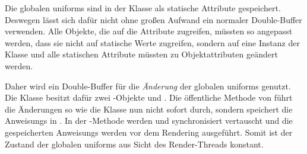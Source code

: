Die globalen \glspl{uniform} sind in der Klasse  als statische Attribute gespeichert. Deswegen lässt sich dafür nicht ohne großen Aufwand ein normaler Double-Buffer verwenden. Alle Objekte, die auf die Attribute zugreifen, müssten so angepasst werden, dass sie nicht auf statische Werte zugreifen, sondern auf eine Instanz der Klasse und alle statischen Attribute müssten zu Objektattributen geändert werden.

Daher wird ein Double-Buffer für die \emph{Änderung} der globalen \glspl{uniform} genutzt. Die Klasse  besitzt dafür zwei -Objekte  und . Die öffentliche Methode  von  führt die Änderungen so wie die Klasse  nun nicht sofort durch, sondern speichert die \glspl{Anweisung} in . In der -Methode werden  und  synchronisiert vertauscht und die gespeicherten \glspl{Anweisung} werden vor dem Rendering ausgeführt. Somit ist der Zustand der globalen \glspl{uniform} aus Sicht des Render-Threads konstant.

